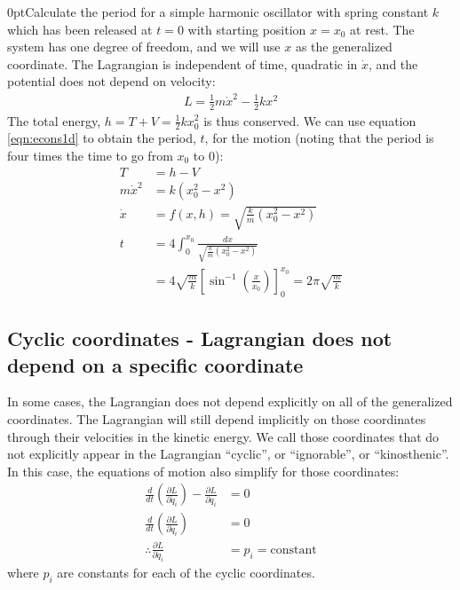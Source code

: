 \begin{example}{0pt}{Calculate the period for a simple harmonic oscillator with spring constant $k$ which has been released at $t=0$ with starting position $x=x_0$ at rest.}{}
The system has one degree of freedom, and we will use $x$ as the generalized coordinate. The Lagrangian is independent of time, quadratic in $\dot{x}$, and the potential does not depend on velocity:
\begin{align*}
L=\frac{1}{2}m\dot{x}^2-\frac{1}{2}kx^2
\end{align*}
The total energy, $h=T+V=\frac{1}{2}kx_0^2$ is thus conserved. We can use equation \ref{eqn:econs1d} to obtain the period, $t$, for the motion (noting that the period is four times the time to go from $x_0$ to $0$):
\begin{align*}
T&=h-V\\
m\dot{x}^2&=k(x_0^2-x^2)\\
\dot{x}&=f(x,h)=\sqrt{\frac{k}{m}(x_0^2-x^2)}\\
t&=4\int_{0}^{x_0}\frac{dx}{\sqrt{\frac{k}{m}(x_0^2-x^2)}}\\
&=4\sqrt{\frac{m}{k}}\left[\sin^{-1}\left(\frac{x}{x_0}\right)\right]_0^{x_0}=2\pi\sqrt{\frac{m}{k}}
\end{align*}
\end{example}

\subsection{Cyclic coordinates - Lagrangian does not depend on a specific coordinate}
In some cases, the Lagrangian does not depend explicitly on all of the generalized coordinates. The Lagrangian will still depend implicitly on those coordinates through their velocities in the kinetic energy. We call those coordinates that do not explicitly appear in the Lagrangian ``cyclic'', or ``ignorable'', or ``kinosthenic''. In this case, the equations of motion also simplify for those coordinates:
\begin{align}
\frac{d}{dt}\left(\frac{\partial L}{\partial \dot{q}_i} \right) - \frac{\partial L}{\partial q_i}&=0\nonumber\\
\frac{d}{dt}\left(\frac{\partial L}{\partial \dot{q}_i} \right)&=0\nonumber\\
\therefore \frac{\partial L}{\partial \dot{q}_i}&=p_i=\text{constant}
\label{eqn:cyclic}
\end{align}
where $p_i$ are constants for each of the cyclic coordinates.

